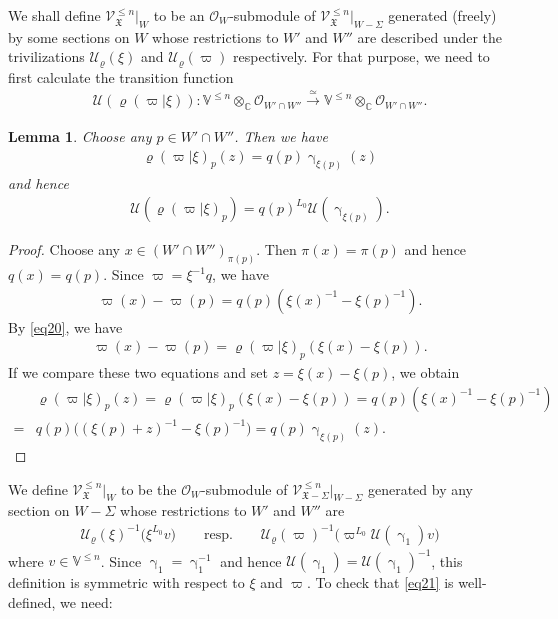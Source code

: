 \documentclass[12pt,a4paper,notitlepage]{article}
\theoremstyle{definition}
\theoremstyle{plain}
\newtheorem{lm}[df]{Lemma}
\newcommand{\fk}{\mathfrak}
\newcommand{\mc}{\mathcal}
\newcommand{\scr}{\mathscr}
\newcommand{\Vbb}{\mathbb V}
\newcommand{\Cbb}{\mathbb C}
\numberwithin{equation}{section}
\begin{document}
We shall define $\scr V^{\leq n}_{\fk X}|_{W}$ to be an $\scr O_{W}$-submodule of $\scr V_{\fk X}^{\leq n}|_{W-\Sigma}$ generated (freely) by some sections on $W$ whose restrictions to $W'$ and $W''$ are described under the trivilizations $\mc U_\varrho(\xi)$ and $\mc U_\varrho(\varpi)$ respectively. For that purpose, we need to first calculate the transition function \begin{align*}
\mc U(\varrho(\varpi|\xi)):\Vbb^{\leq n}\otimes_{\Cbb}\scr O_{W'\cap W''}\xrightarrow{\simeq} \Vbb^{\leq n}\otimes_{\Cbb}\scr O_{W'\cap W''}.
\end{align*}


\begin{lm}\label{lb7}
	Choose any $p\in W'\cap W''$. Then we have
	\begin{gather*}
	\varrho(\varpi|\xi)_p(z)=q(p)\upgamma_{\xi(p)}(z)
	\end{gather*}
	and hence
	\begin{align*}
	\mc U(\varrho(\varpi|\xi)_p)=q(p)^{L_0}\mc U(\upgamma_{\xi(p)}).
	\end{align*}
\end{lm}
\begin{proof}
	Choose any $x\in (W'\cap W'')_{\pi(p)}$. Then $\pi(x)=\pi(p)$ and hence $q(x)=q(p)$.  Since $\varpi=\xi^{-1}q$, we have
	\begin{align*}
	\varpi(x)-\varpi(p)=q(p)(\xi(x)^{-1}-\xi(p)^{-1}).
	\end{align*}
	By \eqref{eq20}, we have
	\begin{align*}
	\varpi(x)-\varpi(p)=\varrho(\varpi|\xi)_p(\xi(x)-\xi(p)).
	\end{align*}
	If we compare these two equations and set $z=\xi(x)-\xi(p)$, we obtain
	\begin{align*}
	&\varrho(\varpi|\xi)_p(z)=\varrho(\varpi|\xi)_p(\xi(x)-\xi(p))=q(p)(\xi(x)^{-1}-\xi(p)^{-1})\\
	=&q(p)\big((\xi(p)+z)^{-1}-\xi(p)^{-1} \big)=q(p)\upgamma_{\xi(p)}(z).
	\end{align*}
\end{proof}



We   define $\scr V_{\fk X}^{\leq n}|_{W}$ to be the  $\scr O_{W}$-submodule of $\scr V_{\fk X-\Sigma}^{\leq n}|_{W-\Sigma}$ generated by any section on $W-\Sigma$ whose restrictions to $W'$ and $W''$ are
\begin{align}
\boxed{~~\mc U_\varrho(\xi)^{-1}\big(\xi^{L_0}v\big)\qquad\text{resp.}\qquad \mc U_\varrho(\varpi)^{-1}\big(\varpi^{L_0}\mc U(\upgamma_1)v\big)  ~~}\label{eq21}
\end{align}
where $v\in\Vbb^{\leq n}$. Since $\upgamma_1=\upgamma_1^{-1}$ and hence $\mc U(\upgamma_1)=\mc U(\upgamma_1)^{-1}$, this definition is symmetric with respect to $\xi$ and $\varpi$. To check that \eqref{eq21} is well-defined, we need:
\end{document}
